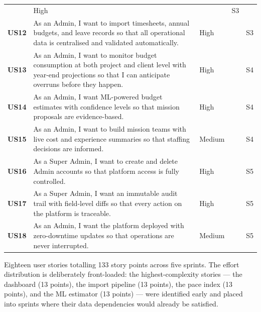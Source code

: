 \documentclass[12pt,a4paper]{report}
\begin{document}
\begin{longtable}{>{\bfseries}p{1.1cm} p{6.8cm} >{\centering\arraybackslash}p{1.6cm}
                  >{\centering\arraybackslash}p{1.4cm} >{\centering\arraybackslash}p{1.2cm}}
        & High & 8 & S3\\[3pt]
  US12 & As an Admin, I want to import timesheets, annual budgets, and leave records so that all operational data is centralised and validated automatically.
        & High & 13 & S3\\[3pt]
  US13 & As an Admin, I want to monitor budget consumption at both project and client level with year-end projections so that I can anticipate overruns before they happen.
        & High & 13 & S4\\[3pt]
  US14 & As an Admin, I want ML-powered budget estimates with confidence levels so that mission proposals are evidence-based.
        & High & 13 & S4\\[3pt]
  US15 & As an Admin, I want to build mission teams with live cost and experience summaries so that staffing decisions are informed.
        & Medium & 8 & S4\\[3pt]
  US16 & As a Super Admin, I want to create and delete Admin accounts so that platform access is fully controlled.
        & High & 5 & S5\\[3pt]
  US17 & As a Super Admin, I want an immutable audit trail with field-level diffs so that every action on the platform is traceable.
        & High & 8 & S5\\[3pt]
  US18 & As an Admin, I want the platform deployed with zero-downtime updates so that operations are never interrupted.
        & Medium & 5 & S5\\[3pt]

\end{longtable}

Eighteen user stories totalling 133 story points across five sprints. The effort
distribution is deliberately front-loaded: the highest-complexity stories --- the
dashboard (13 points), the import pipeline (13 points), the pace index (13 points),
and the ML estimator (13 points) --- were identified early and placed into sprints
where their data dependencies would already be satisfied.
\end{document}
